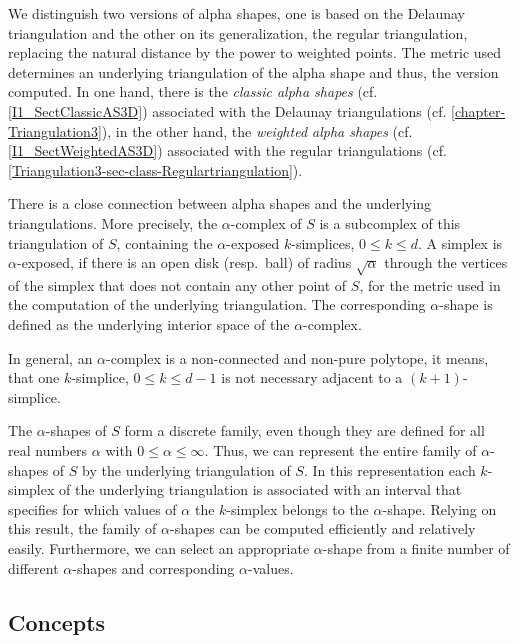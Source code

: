 We distinguish two versions of alpha shapes, one is based on the Delaunay
triangulation and the other on its generalization, the regular triangulation,
replacing the natural distance by the power to weighted points. The metric used
determines an underlying triangulation of the alpha shape and thus, the version
computed. 
In one hand, there is the {\em classic alpha shapes}
(cf. \ref{I1_SectClassicAS3D}) associated with the Delaunay triangulations
(cf. \ref{chapter-Triangulation3}), in the other hand, the {\em weighted alpha shapes}
(cf. \ref{I1_SectWeightedAS3D}) associated with the regular triangulations
(cf. \ref{Triangulation3-sec-class-Regulartriangulation}). 

There is a close connection between alpha shapes and the underlying
triangulations. More precisely, the $\alpha$-complex of $S$ is a
subcomplex of this triangulation of $S$, containing the $\alpha$-exposed
$k$-simplices, $0 \leq k \leq d$. A simplex is $\alpha$-exposed, if there is an
open disk (resp.\ ball) of radius $\sqrt{\alpha}$ through the vertices of the
simplex that does not contain any other point of $S$, for the metric used in
the computation of the underlying triangulation.  The corresponding
$\alpha$-shape is defined as the underlying interior space of the
$\alpha$-complex. 

In general, an $\alpha$-complex is a non-connected and non-pure polytope, it
means, that one $k$-simplice, $0 \leq k \leq d-1$ is not necessary adjacent to
a $(k+1)$-simplice.

The $\alpha$-shapes of $S$ form a discrete family, even though they
are defined for all real numbers $\alpha$ with $0 \leq \alpha
\leq \infty$. Thus, we can represent the entire family of $\alpha$-shapes
of $S$ by the underlying triangulation of $S$. In this representation
each $k$-simplex of the underlying triangulation is associated with an
interval that specifies for which values of $\alpha$ the $k$-simplex
belongs to the $\alpha$-shape. Relying on this result, the family of
$\alpha$-shapes can be computed efficiently and relatively
easily. Furthermore, we can select an appropriate $\alpha$-shape from a
finite number of different $\alpha$-shapes and corresponding
$\alpha$-values.

\subsection*{Concepts}

\\
\\
\\


